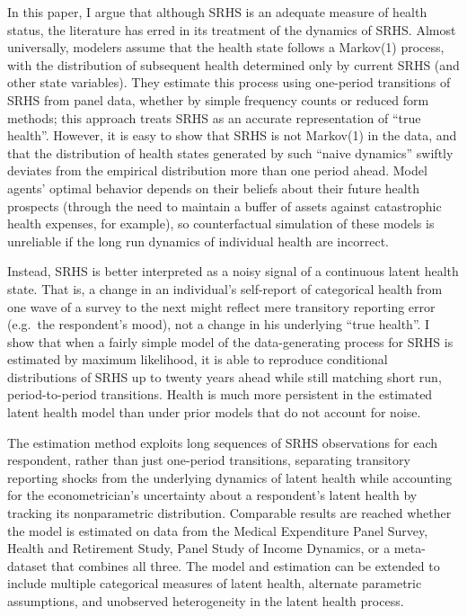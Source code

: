 \documentclass[12pt,pdftex,letterpaper]{article}
\begin{document}
In this paper, I argue that although SRHS is an adequate measure of health status, the literature has erred in its treatment of the dynamics of SRHS.  Almost universally, modelers assume that the health state follows a Markov(1) process, with the distribution of subsequent health determined only by current SRHS (and other state variables). They estimate this process using one-period transitions of SRHS from panel data, whether by simple frequency counts or reduced form methods; this approach treats SRHS as an accurate representation of ``true health''.  However, it is easy to show that SRHS is not Markov(1) in the data, and that the distribution of health states generated by such ``naive dynamics'' swiftly deviates from the empirical distribution more than one period ahead.  Model agents' optimal behavior depends on their beliefs about their future health prospects (through the need to maintain a buffer of assets against catastrophic health expenses, for example), so counterfactual simulation of these models is unreliable if the long run dynamics of individual health are incorrect.

Instead, SRHS is better interpreted as a noisy signal of a continuous latent health state.  That is, a change in an individual's self-report of categorical health from one wave of a survey to the next might reflect mere transitory reporting error (e.g.\ the respondent's mood), not a change in his underlying ``true health''.  I show that when a fairly simple model of the data-generating process for SRHS is estimated by maximum likelihood, it is able to reproduce conditional distributions of SRHS up to twenty years ahead while still matching short run, period-to-period transitions.  Health is much more persistent in the estimated latent health model than under prior models that do not account for noise.

The estimation method exploits long sequences of SRHS observations for each respondent, rather than just one-period transitions, separating transitory reporting shocks from the underlying dynamics of latent health while accounting for the econometrician's uncertainty about a respondent's latent health by tracking its nonparametric distribution.  Comparable results are reached whether the model is estimated on data from the Medical Expenditure Panel Survey, Health and Retirement Study, Panel Study of Income Dynamics, or a meta-dataset that combines all three. The model and estimation can be extended to include multiple categorical measures of latent health, alternate parametric assumptions, and unobserved heterogeneity in the latent health process.
\end{document}

